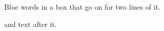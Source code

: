 \documentclass{article}
\begin{document}
\noindent\parbox{5cm}{\color{blue}Blue words in a box that go on for two lines of it.}
and text after it.
\end{document}
